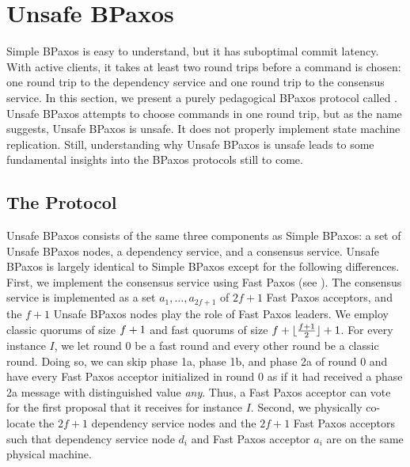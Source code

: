 \section{Unsafe BPaxos}
Simple BPaxos is easy to understand, but it has suboptimal commit latency.
With active clients, it takes at least two round trips before a command is
chosen: one round trip to the dependency service and one round trip to the
consensus service. In this section, we present a purely pedagogical BPaxos
protocol called . Unsafe BPaxos attempts to choose
commands in one round trip, but as the name suggests, Unsafe BPaxos is unsafe.
It does not properly implement state machine replication. Still, understanding
why Unsafe BPaxos is unsafe leads to some fundamental insights into the BPaxos
protocols still to come.

\subsection{The Protocol}
Unsafe BPaxos consists of the same three components as Simple BPaxos: a set of
Unsafe BPaxos nodes, a dependency service, and a consensus service. Unsafe
BPaxos is largely identical to Simple BPaxos except for the following
differences.
%
First, we implement the consensus service using Fast Paxos (see
). The consensus service is implemented as a set $a_1,
\ldots, a_{2f + 1}$ of $2f + 1$ Fast Paxos acceptors, and the $f + 1$ Unsafe
BPaxos nodes play the role of Fast Paxos leaders. We employ classic quorums of
size $f + 1$ and fast quorums of size $f + \lfloor\frac{f + 1}{2}\rfloor + 1$. For every
instance $I$, we let round $0$ be a fast round and every other round be a
classic round. Doing so, we can skip phase 1a, phase 1b, and phase 2a of round
$0$ and have every Fast Paxos acceptor initialized in round $0$ as if it had
received a phase 2a message with distinguished value \emph{any}. Thus, a Fast
Paxos acceptor can vote for the first proposal that it receives for instance
$I$.
%
Second, we physically co-locate the $2f + 1$ dependency service nodes and the
$2f + 1$ Fast Paxos acceptors such that dependency service node $d_i$ and Fast
Paxos acceptor $a_i$ are on the same physical machine.

